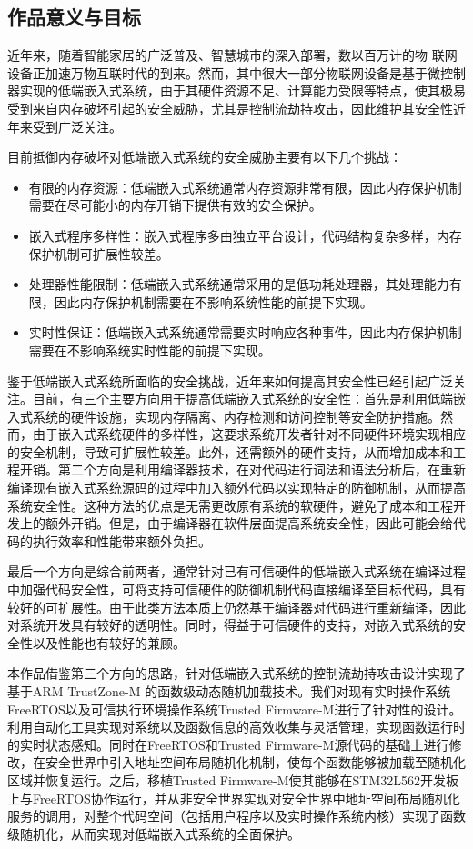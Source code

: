 \documentclass[UTF8,12pt,a4paper,twoside]{ctexart}
\numberwithin{figure}{section}
\begin{document}
\subsection{作品意义与目标}
\par 近年来，随着智能家居的广泛普及、智慧城市的深入部署，数以百万计的物 联网设备正加速万物互联时代的到来。然而，其中很大一部分物联网设备是基于微控制器实现的低端嵌入式系统，由于其硬件资源不足、计算能力受限等特点，使其极易受到来自内存破坏引起的安全威胁，尤其是控制流劫持攻击，因此维护其安全性近年来受到广泛关注。
\par 目前抵御内存破坏对低端嵌入式系统的安全威胁主要有以下几个挑战：
\begin{itemize}
    \item 有限的内存资源：低端嵌入式系统通常内存资源非常有限，因此内存保护机制需要在尽可能小的内存开销下提供有效的安全保护。
    \item 嵌入式程序多样性：嵌入式程序多由独立平台设计，代码结构复杂多样，内存保护机制可扩展性较差。
    \item 处理器性能限制：低端嵌入式系统通常采用的是低功耗处理器，其处理能力有限，因此内存保护机制需要在不影响系统性能的前提下实现。
    \item 实时性保证：低端嵌入式系统通常需要实时响应各种事件，因此内存保护机制需要在不影响系统实时性能的前提下实现。
\end{itemize}
\par 鉴于低端嵌入式系统所面临的安全挑战，近年来如何提高其安全性已经引起广泛关注。目前，有三个主要方向用于提高低端嵌入式系统的安全性：首先是利用低端嵌入式系统的硬件设施，实现内存隔离、内存检测和访问控制等安全防护措施。然而，由于嵌入式系统硬件的多样性，这要求系统开发者针对不同硬件环境实现相应的安全机制，导致可扩展性较差。此外，还需额外的硬件支持，从而增加成本和工程开销。第二个方向是利用编译器技术，在对代码进行词法和语法分析后，在重新编译现有嵌入式系统源码的过程中加入额外代码以实现特定的防御机制，从而提高系统安全性。这种方法的优点是无需更改原有系统的软硬件，避免了成本和工程开发上的额外开销。但是，由于编译器在软件层面提高系统安全性，因此可能会给代码的执行效率和性能带来额外负担。
\par 最后一个方向是综合前两者，通常针对已有可信硬件的低端嵌入式系统在编译过程中加强代码安全性，可将支持可信硬件的防御机制代码直接编译至目标代码，具有较好的可扩展性。由于此类方法本质上仍然基于编译器对代码进行重新编译，因此对系统开发具有较好的透明性。同时，得益于可信硬件的支持，对嵌入式系统的安全性以及性能也有较好的兼顾。 
\par 本作品借鉴第三个方向的思路，针对低端嵌入式系统的控制流劫持攻击设计实现了基于ARM TrustZone-M 的函数级动态随机加载技术。我们对现有实时操作系统FreeRTOS以及可信执行环境操作系统Trusted Firmware-M进行了针对性的设计。利用自动化工具实现对系统以及函数信息的高效收集与灵活管理，实现函数运行时的实时状态感知。同时在FreeRTOS和Trusted Firmware-M源代码的基础上进行修改，在安全世界中引入地址空间布局随机化机制，使每个函数能够被加载至随机化区域并恢复运行。之后，移植Trusted Firmware-M使其能够在STM32L562开发板上与FreeRTOS协作运行，并从非安全世界实现对安全世界中地址空间布局随机化服务的调用，对整个代码空间（包括用户程序以及实时操作系统内核）实现了函数级随机化，从而实现对低端嵌入式系统的全面保护。
\end{document}
